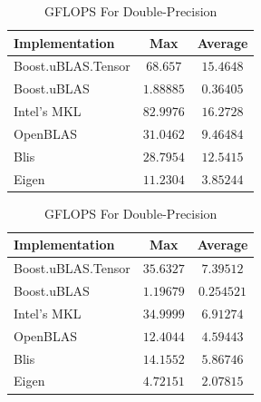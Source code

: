 \begin{table}[ht]
    \centering
    \caption{GFLOPS For Single-Precision}
    \begin{tabular}{|l|c|c|}
        \hline
        \textbf{Implementation} & \textbf{Max} & \textbf{Average}\\
        \hline
        Boost.uBLAS.Tensor  & $68.657$& $15.4648$ \\
        \hline
        Boost.uBLAS         & $1.88885$& $0.36405$ \\
        \hline
        Intel's MKL         & $82.9976$& $16.2728$ \\
        \hline
        OpenBLAS            & $31.0462$& $9.46484$ \\
        \hline
        Blis                & $28.7954$& $12.5415$ \\
        \hline
        Eigen               & $11.2304$& $3.85244$ \\
        \hline
    \end{tabular}

    \vspace*{1 cm}

    \centering
    \caption{GFLOPS For Double-Precision}
    \begin{tabular}{|l|c|c|}
        \hline
        \textbf{Implementation} & \textbf{Max} & \textbf{Average}\\
        \hline
        Boost.uBLAS.Tensor  & $35.6327$ & $7.39512$ \\
        \hline
        Boost.uBLAS         & $1.19679$ & $0.254521$ \\
        \hline
        Intel's MKL         & $34.9999$ & $6.91274$ \\
        \hline
        OpenBLAS            & $12.4044$ & $4.59443$ \\
        \hline
        Blis                & $14.1552$ & $5.86746$ \\
        \hline
        Eigen               & $4.72151$ & $2.07815$ \\
        \hline
    \end{tabular}
\end{table}

